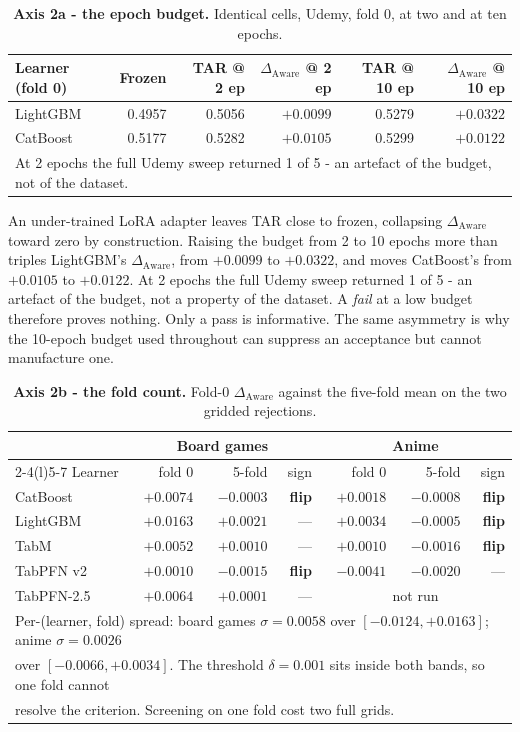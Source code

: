 \documentclass{article}
\newcommand{\daware}{\Delta_{\text{Aware}}}
\begin{document}
\begin{table}[H]
\centering\small
\caption{\textbf{Axis 2a - the epoch budget.} Identical cells, Udemy, fold 0, at two and at
ten epochs.}
\begin{tabular}{lrrrrr}
\toprule
Learner (fold 0) & Frozen & TAR @ 2 ep & $\daware$ @ 2 ep & TAR @ 10 ep & $\daware$ @ 10 ep \\
\midrule
LightGBM & 0.4957 & 0.5056 & $+0.0099$ & 0.5279 & $\mathbf{+0.0322}$ \\
CatBoost & 0.5177 & 0.5282 & $+0.0105$ & 0.5299 & $\mathbf{+0.0122}$ \\
\midrule
\multicolumn{6}{l}{At 2 epochs the full Udemy sweep returned 1 of 5 - an artefact of the budget, not of the dataset.} \\
\bottomrule
\end{tabular}
\end{table}

\noindent An under-trained LoRA adapter leaves TAR close to frozen, collapsing $\daware$ toward zero by
construction. Raising the budget from 2 to 10 epochs more than triples LightGBM's $\daware$, from
$+0.0099$ to $+0.0322$, and moves CatBoost's from $+0.0105$ to $+0.0122$. At 2 epochs the full
Udemy sweep returned 1 of 5 - an artefact of the budget, not a property of the dataset. A
\emph{fail} at a low budget therefore proves nothing. Only a pass is informative. The same
asymmetry is why the 10-epoch budget used throughout can suppress an acceptance but cannot
manufacture one.


\begin{table}[H]
\centering\small
\caption{\textbf{Axis 2b - the fold count.} Fold-0 $\daware$ against the five-fold mean on the
two gridded rejections.}
\begin{tabular}{lrrr@{\hskip 22pt}rrr}
\toprule
& \multicolumn{3}{c}{Board games} & \multicolumn{3}{c}{Anime} \\
\cmidrule(r){2-4}\cmidrule(l){5-7}
Learner & fold 0 & 5-fold & sign & fold 0 & 5-fold & sign \\
\midrule
CatBoost   & $+0.0074$ & $-0.0003$ & \textbf{flip} & $+0.0018$ & $-0.0008$ & \textbf{flip} \\
LightGBM   & $+0.0163$ & $+0.0021$ & --- & $+0.0034$ & $-0.0005$ & \textbf{flip} \\
TabM       & $+0.0052$ & $+0.0010$ & --- & $+0.0010$ & $-0.0016$ & \textbf{flip} \\
TabPFN v2  & $+0.0010$ & $-0.0015$ & \textbf{flip} & $-0.0041$ & $-0.0020$ & --- \\
TabPFN-2.5 & $+0.0064$ & $+0.0001$ & --- & \multicolumn{3}{c}{not run} \\
\midrule
\multicolumn{7}{l}{Per-(learner, fold) spread: board games $\sigma = 0.0058$ over $[-0.0124, +0.0163]$; anime $\sigma = 0.0026$} \\
\multicolumn{7}{l}{over $[-0.0066, +0.0034]$. The threshold $\delta = 0.001$ sits inside both bands, so one fold cannot} \\
\multicolumn{7}{l}{resolve the criterion. Screening on one fold cost two full grids.} \\
\bottomrule
\end{tabular}
\end{table}
\end{document}
